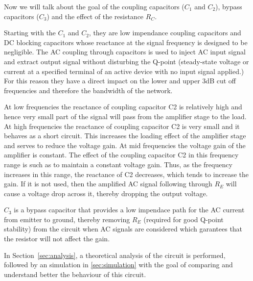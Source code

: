 Now we will talk about the goal of the coupling capacitors ($C_{1}$ and $C_{2}$), bypass capacitors ($C_{3}$) and the effect of the resistance $R_{C}$.


Starting with the $C_{1}$ and $C_{2}$, they are low impendance coupling capacitors and DC blocking capacitors whose reactance at the signal frequency is designed to be negligible.
The AC coupling through capacitors is used to inject AC input signal and extract output signal without disturbing the Q-point (steady-state voltage or current at a specified terminal of an active device with no input signal applied.)
For this reason they have a direct impact on the lower and upper 3dB cut off frequencies and therefore the bandwidth of the network.

At low frequencies the reactance of coupling capacitor C2 is relatively high and hence very small part of the signal will pass from the amplifier stage to the load.
At high frequencies the reactance of coupling capacitor C2 is very small and it behaves as a short circuit. This increases the loading effect of the amplifier stage and serves to reduce the voltage gain.
At mid frequencies the voltage gain of the amplifier is constant. The effect of the coupling capacitor C2 in this frequency range is such as to maintain a constant voltage gain. Thus, as the frequency increases in this range, the reactance of C2 decreases, which tends to increase the gain.
If it is not used, then the amplified AC signal following through $R_{E}$ will cause a voltage drop across it, thereby dropping the output voltage.

$C_{3}$ is a bypass capacitor that provides a low impendace path for the AC current from emitter to ground,
thereby removing $R_{E}$ (required for good Q-point stability) from the circuit when AC signals are considered which garantees that the resistor will not affect the gain.

In Section~\ref{sec:analysis}, a theoretical analysis of the circuit is performed, followed by an simulation in \ref{sec:simulation}
with the goal of comparing and understand better the behaviour of this circuit.



